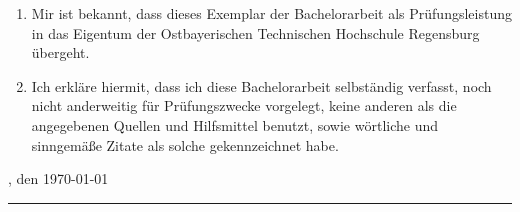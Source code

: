 



\begin{enumerate}
\item Mir ist bekannt, dass dieses Exemplar der Bachelorarbeit als Prüfungsleistung in
das Eigentum der Ostbayerischen Technischen Hochschule Regensburg übergeht.\\
\item Ich erkläre hiermit, dass ich diese Bachelorarbeit selbständig verfasst, noch nicht anderweitig für Prüfungszwecke vorgelegt, keine anderen als die angegebenen Quellen und Hilfsmittel benutzt, sowie wörtliche und sinngemäße Zitate als solche gekennzeichnet habe.\\[10ex]
\end{enumerate}

\ort, den \today


\rule[-0.2cm]{5cm}{0.5pt}

\textsc{\autor} 